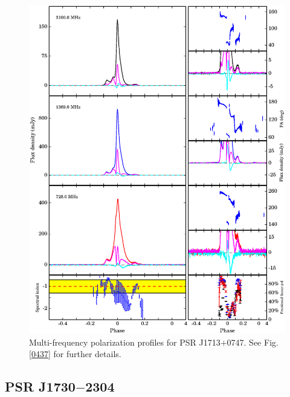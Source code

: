 \documentclass[useAMS,usenatbib]{mn2e}
\begin{document}

\begin{figure}
\begin{center}
\includegraphics[width=6 in]{1713.ps}
\caption{Multi-frequency polarization profiles for PSR J1713$+$0747. 
See Fig. \ref{0437} for further details.}
\label{1713}
\end{center}
\end{figure}

\subsection{PSR J1730$-$2304}
\end{document}
